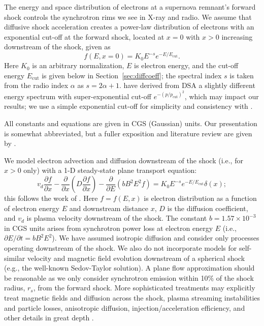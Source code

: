 \documentclass[iop, apj, numberedappendix]{emulateapj}
\newcommand*{\mt}{\mathrm}
\newcommand*{\ptl}{\partial}
\newcommand*{\Ecut}{E_{\mt{cut}}}
\begin{document}
The energy and space distribution of electrons at a supernova remnant's forward
shock controls the synchrotron rims we see in X-ray and radio.  We assume that
diffusive shock acceleration creates a power-law distribution of electrons with
an exponential cut-off at the forward shock, located at $x = 0$ with $x > 0$
increasing downstream of the shock, given as
\begin{equation}
    f(E, x=0) = K_0 E^{-s} e^{-E/\Ecut} .
\end{equation}
Here $K_0$ is an arbitrary normalization, $E$ is electron energy, and the
cut-off energy $\Ecut$ is given below in Section~\ref{sec:diffcoeff}; the
spectral index $s$ is taken from the radio index $\alpha$ as $s = 2\alpha + 1$.
\citet{zirakashvili2007} have derived from DSA a slightly different energy
spectrum with super-exponential cut-off $e^{-(p/p_{\mt{cut}})^2}$, which may
impact our results; we use a simple exponential cut-off for simplicity and
consistency with .

All constants and equations are given in CGS (Gaussian) units.  Our
presentation is somewhat abbreviated, but a fuller exposition and literature
review are given by .

We model electron advection and diffusion downstream of the shock (i.e., for
$x>0$ only) with a 1-D steady-state plane transport equation:
\begin{equation} \label{eq:model}
    v_d \frac{\ptl f}{\ptl x}
    - \frac{\ptl}{\ptl x} \left(D\frac{\ptl f}{\ptl x}\right)
    - \frac{\ptl}{\ptl E} \left(bB^2E^2f\right)
    = K_0 E^{-s} e^{-E/\Ecut} \delta(x) ;
\end{equation}
this follows the work of \citet{webb1984, berezhko2004, cassam-chenai2007,
morlino2010, rettig2012}.  Here $f = f(E,x)$ is electron distribution as a
function of electron energy $E$ and downstream distance $x$, $D$ is the
diffusion coefficient, and $v_d$ is plasma velocity downstream of the shock.
The constant $b = 1.57 \times 10^{-3}$ in CGS units arises from synchrotron
power loss at electron energy $E$ (i.e., $\ptl E/\ptl t = b B^2 E^2$).
We have assumed isotropic diffusion and consider only processes operating
downstream of the shock.  We also do not incorporate models for self-similar
velocity and magnetic field evolution downstream of a spherical shock (e.g.,
the well-known Sedov-Taylor solution).  A plane flow approximation should be
reasonable as we only consider synchrotron emission within 10\% of the shock
radius, $r_s$, from the forward shock.  %
More sophisticated treatments may explicitly treat
magnetic fields and diffusion across the shock, plasma streaming instabilities
and particle losses, anisotropic diffusion, injection/acceleration efficiency,
and other details in great depth \citep[e.g.,][and references
therein]{reville2013, bykov2014, ferrand2014}.
\end{document}
